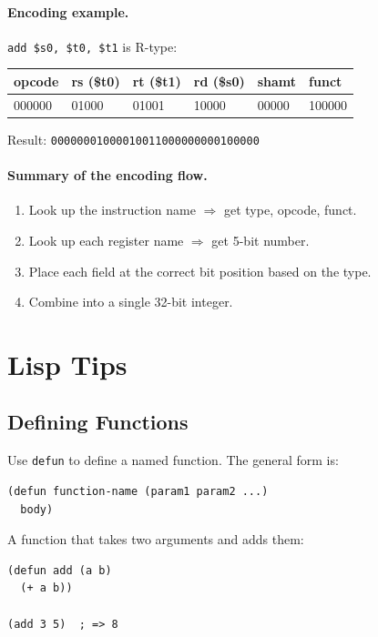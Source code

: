 \paragraph{Encoding example.}
\texttt{add \$s0, \$t0, \$t1} is R-type:

\begin{center}
\begin{tabular}{llllll}
  \toprule
  opcode & rs (\$t0) & rt (\$t1) & rd (\$s0) & shamt & funct \\
  \midrule
  000000 & 01000 & 01001 & 10000 & 00000 & 100000 \\
  \bottomrule
\end{tabular}
\end{center}

Result: \texttt{00000001000010011000000000100000}

\paragraph{Summary of the encoding flow.}

\begin{enumerate}
  \item Look up the instruction name $\Rightarrow$ get type, opcode, funct.
  \item Look up each register name $\Rightarrow$ get 5-bit number.
  \item Place each field at the correct bit position based on the type.
  \item Combine into a single 32-bit integer.
\end{enumerate}

\section{Lisp Tips}

\subsection{Defining Functions}

Use \texttt{defun} to define a named function.
The general form is:

\begin{lstlisting}
(defun function-name (param1 param2 ...)
  body)
\end{lstlisting}

A function that takes two arguments and adds them:

\begin{lstlisting}
(defun add (a b)
  (+ a b))

(add 3 5)  ; => 8
\end{lstlisting}

